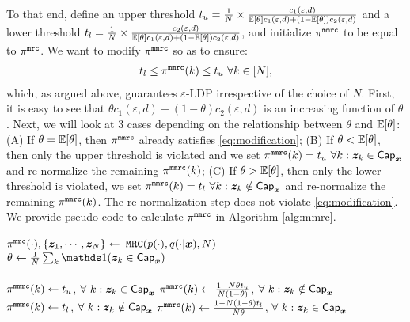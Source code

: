 To that end, define an upper threshold $t_u = \frac{1}{N} \times \frac{c_1(\varepsilon, d)}{\mathbb{E}[\theta] c_1(\varepsilon, d) + (1 - \mathbb{E}[\theta]) c_2(\varepsilon, d)}$ and a lower threshold  $t_l = \frac{1}{N} \times \frac{c_2(\varepsilon, d)}{\mathbb{E}[\theta] c_1(\varepsilon, d) + (1 - \mathbb{E}[\theta]) c_2(\varepsilon, d)}$, and initialize $\pi^{\texttt{mmrc}}$ to be equal to $\pi^{\texttt{mrc}}$. We want to modify $\pi^{\texttt{mmrc}}$ so as to ensure:
\begin{align}
    t_l \leq \pi^{\texttt{mmrc}}(k) \leq t_u ~ \forall k \in [N], \label{eq:modification}
\end{align}
which, as argued above, guarantees $\varepsilon$-LDP irrespective of the choice of $N$.
First, it is easy to see that $\theta c_1(\varepsilon, d) + (1 - \theta) c_2(\varepsilon, d)$ is an increasing function of $\theta$. Next, we will look at 3 cases depending on the relationship between $\theta$ and $\mathbb{E}[\theta]$: (A) If $\theta = \mathbb{E}[\theta]$, then $\pi^{\texttt{mmrc}}$ already satisfies \eqref{eq:modification}; (B) If $\theta < \mathbb{E}[\theta]$, then only the upper threshold is violated and we set $\pi^{\texttt{mmrc}}(k) = t_u ~ \forall k : {\boldsymbol{z}}_k \in \mathsf{Cap}_{{\boldsymbol{x}}}$ and re-normalize the remaining $\pi^{\texttt{mmrc}}(k)$; (C) If $\theta > \mathbb{E}[\theta]$, then only the lower threshold is violated, we set $\pi^{\texttt{mmrc}}(k) = t_l ~ \forall k : {\boldsymbol{z}}_k \notin \mathsf{Cap}_{{\boldsymbol{x}}}$ and re-normalize the remaining $\pi^{\texttt{mmrc}}(k)$. The re-normalization step does not violate \eqref{eq:modification}. We provide pseudo-code to calculate $\pi^{\texttt{mmrc}}$ in Algorithm \ref{alg:mmrc}. 

\begin{algorithm}
{}
$\pi^{\texttt{mrc}}(\cdot), \{{\boldsymbol{z}}_1 , \cdots, {\boldsymbol{z}}_N \} \leftarrow$ $\texttt{MRC}(p(\cdot), q(\cdot|{\boldsymbol{x}}), N)$\\
$\theta \leftarrow \frac{1}{N} \sum_{k} \Indicator(\svbz_k \in \msf{Cap}_{\svbx})$ \\
\KwInitialization{$\piMMRC(\cdot) \leftarrow \piMRC(\cdot)$}
  {\\
  $\pi^{\texttt{mmrc}}(k) \leftarrow t_u$, $\forall ~ k : {\boldsymbol{z}}_k \in \mathsf{Cap}_{{\boldsymbol{x}}}$
  $\pi^{\texttt{mmrc}}(k) \leftarrow \frac{1-N \theta t_u }{N(1 - \theta)}$, $\forall ~ k : {\boldsymbol{z}}_k \notin \mathsf{Cap}_{{\boldsymbol{x}}}$ 
  }
    {\\
  $\pi^{\texttt{mmrc}}(k) \leftarrow t_l$, $\forall ~ k : {\boldsymbol{z}}_k \notin \mathsf{Cap}_{{\boldsymbol{x}}}$
  $\pi^{\texttt{mmrc}}(k) \leftarrow \frac{1-N (1-\theta) t_l }{N \theta }$, $\forall ~ k : {\boldsymbol{z}}_k \in \mathsf{Cap}_{{\boldsymbol{x}}}$
  }
\caption{$\MMRC$}
\label{alg:mmrc}
\end{algorithm}

